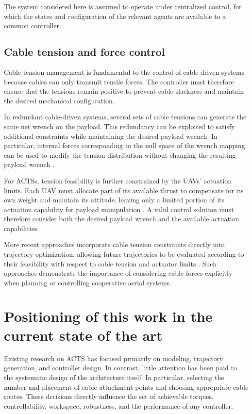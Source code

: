 The system considered here is assumed to operate under centralized control, for which the states and configuration of the relevant agents are available to a common controller.


\subsection{Cable tension and force control}

Cable tension management is fundamental to the control of cable-driven systems because cables can only transmit tensile forces. The controller must therefore ensure that the tensions remain positive to prevent cable slackness and maintain the desired mechanical configuration.

In redundant cable-driven systems, several sets of cable tensions can generate the same net wrench on the payload. This redundancy can be exploited to satisfy additional constraints while maintaining the desired payload wrench. In particular, internal forces corresponding to the null space of the wrench mapping can be used to modify the tension distribution without changing the resulting payload wrench \cite{masone_cooperative_2016, jamshidifar_static_2020}.

For ACTSs, tension feasibility is further constrained by the UAVs' actuation limits. Each UAV must allocate part of its available thrust to compensate for its own weight and maintain its attitude, leaving only a limited portion of its actuation capability for payload manipulation \cite{erskine_wrench_2019}. A valid control solution must therefore consider both the desired payload wrench and the available actuation capabilities.

More recent approaches incorporate cable tension constraints directly into trajectory optimization, allowing future trajectories to be evaluated according to their feasibility with respect to cable tension and actuator limits \cite{sun_agile_2025}. Such approaches demonstrate the importance of considering cable forces explicitly when planning or controlling cooperative aerial systems.

\section{Positioning of this work in the current state of the art}

Existing research on ACTS has focused primarily on modeling, trajectory generation, and controller design. In contrast, little attention has been paid to the systematic design of the architecture itself. In particular, selecting the number and placement of cable attachment points and choosing appropriate cable routes. These decisions directly influence the set of achievable torques, controllability, workspace, robustness, and the performance of any controller.

